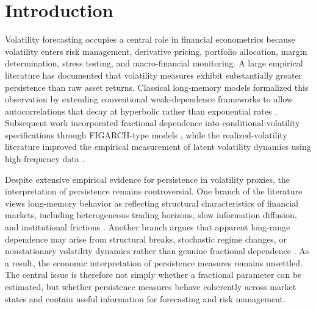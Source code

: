 \documentclass[unnumsec,webpdf,contemporary,large]{oup-authoring-template}%
\theoremstyle{thmstyleone}%
\theoremstyle{thmstyletwo}%
\theoremstyle{thmstylethree}%
\begin{document}


\maketitle


\section{Introduction}
\label{sec:intro}

Volatility forecasting occupies a central role in financial econometrics
because volatility enters risk management, derivative pricing, portfolio
allocation, margin determination, stress testing, and macro-financial
monitoring. A large empirical literature has documented that volatility
measures exhibit substantially greater persistence than raw asset returns.
Classical long-memory models formalized this observation by extending
conventional weak-dependence frameworks to allow autocorrelations that
decay at hyperbolic rather than exponential rates
\citep{granger1980introduction,hosking1981fractional}. Subsequent work
incorporated fractional dependence into conditional-volatility specifications
through FIGARCH-type models \citep{baillie1996fractionally}, while the
realized-volatility literature improved the empirical measurement of latent
volatility dynamics using high-frequency data
\citep{andersen2003modeling,barndorff2002econometric}.

Despite extensive empirical evidence for persistence in volatility proxies,
the interpretation of persistence remains controversial. One branch of the
literature views long-memory behavior as reflecting structural
characteristics of financial markets, including heterogeneous trading
horizons, slow information diffusion, and institutional frictions
\citep{muller1997volatilities}. Another branch argues that apparent
long-range dependence may arise from structural breaks, stochastic regime
changes, or nonstationary volatility dynamics rather than genuine fractional
dependence \citep{mikosch2004nonstationarities}. As a result, the economic
interpretation of persistence measures remains unsettled. The central issue
is therefore not simply whether a fractional parameter can be estimated, but
whether persistence measures behave coherently across market states and
contain useful information for forecasting and risk management.
\end{document}
